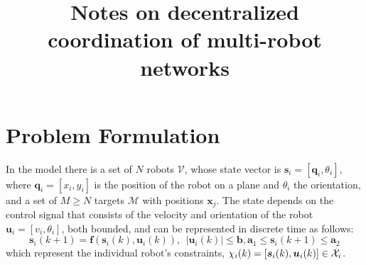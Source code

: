 \documentclass[11pt,draftclsnofoot,onecolumn]{IEEEtran}
\begin{document}
\title{Notes on decentralized coordination of multi-robot networks}
\maketitle


\section{Problem Formulation}
In the model there is a set of $N$ robots $\mathcal{V}$, whose state vector is $\bm s_i=[\bm q_i,\theta_i]$, where $\bm q_i=[x_i,y_i]$ is the position of the robot on a plane and $\theta_i$ the orientation, and a set of $M\geq N$ targets $\mathcal{M}$ with positions $\bm x_j$. The state depends on the control signal that consists of the velocity and orientation of the robot $\bm u_i=[v_i,\theta_i]$, both bounded, and can be represented in discrete time as follows:
\begin{equation}
    \bm s_i(k+1)=\bm f(\bm s_i(k),\bm u_i(k)),~~|\bm u_i(k)|\leq \bm b, \bm a_1\leq\bm s_i(k+1)\leq \bm a_2
\end{equation}
which represent the individual robot's constraints, $\chi_i(k)=[\bm s_i(k),\bm u_i(k)]\in {\cal X}_i$.
\end{document}
